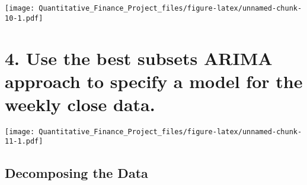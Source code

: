 \documentclass[
]{article}
\newenvironment{Shaded}{\begin{snugshade}}{\end{snugshade}}
\newcommand{\AttributeTok}[1]{\textcolor[rgb]{0.13,0.29,0.53}{#1}}
\newcommand{\CommentTok}[1]{\textcolor[rgb]{0.56,0.35,0.01}{\textit{#1}}}
\newcommand{\DecValTok}[1]{\textcolor[rgb]{0.00,0.00,0.81}{#1}}
\newcommand{\FunctionTok}[1]{\textcolor[rgb]{0.13,0.29,0.53}{\textbf{#1}}}
\newcommand{\NormalTok}[1]{#1}
\newcommand{\OtherTok}[1]{\textcolor[rgb]{0.56,0.35,0.01}{#1}}
\newcommand{\SpecialCharTok}[1]{\textcolor[rgb]{0.81,0.36,0.00}{\textbf{#1}}}
\newcommand{\StringTok}[1]{\textcolor[rgb]{0.31,0.60,0.02}{#1}}
\begin{document}
\texttt{[image: Quantitative\_Finance\_Project\_files/figure-latex/unnamed-chunk-10-1.pdf]}

\newpage

\hypertarget{use-the-best-subsets-arima-approach-to-specify-a-model-for-the-weekly-close-data.}{%
\section{4. Use the best subsets ARIMA approach to specify a model for
the weekly close
data.}\label{use-the-best-subsets-arima-approach-to-specify-a-model-for-the-weekly-close-data.}}

\begin{Shaded}
\end{Shaded}

\texttt{[image: Quantitative\_Finance\_Project\_files/figure-latex/unnamed-chunk-11-1.pdf]}

\hypertarget{decomposing-the-data-1}{%
\subsection{Decomposing the Data}\label{decomposing-the-data-1}}
\end{document}
